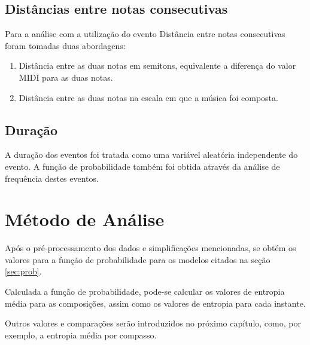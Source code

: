 \subsection{Distâncias entre notas consecutivas}

Para a análise com a utilização do evento Distância entre notas consecutivas foram tomadas duas abordagens:

\begin{enumerate}
    \item Distância entre as duas notas em semitons, equivalente a diferença do valor MIDI para as duas notas.
    \item Distância entre as duas notas na escala em que a música foi composta.
\end{enumerate}

\subsection{Duração}

A duração dos eventos foi tratada como uma variável aleatória independente do evento. A função de probabilidade também foi obtida através da análise de frequência destes eventos.

\section{Método de Análise}

Após o pré-processamento dos dados e simplificações mencionadas, se obtém os valores para a função de probabilidade para os modelos citados na seção \ref{sec:prob}.

Calculada a função de probabilidade, pode-se calcular os valores de entropia média para as composições, assim como os valores de entropia para cada instante. 

Outros valores e comparações serão introduzidos no próximo capítulo, como, por exemplo, a entropia média por compasso.
